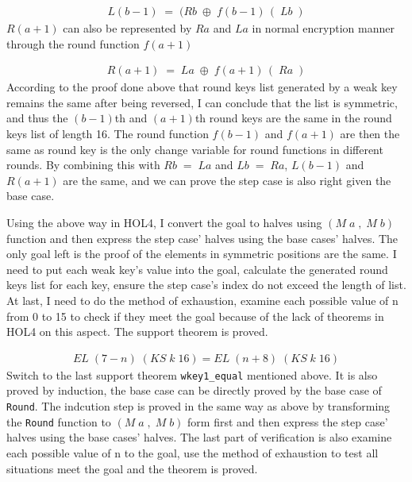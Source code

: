 \documentclass{article}
\begin{document}
\begin{equation*}
\begin{split}
   L(b-1) \; = \; (Rb \; \oplus \; f(b-1)\,(\;Lb\;)
\end{split}
\end{equation*}
$R(a+1)$ can also be represented by $Ra$ and $La$ in normal encryption manner through the round function $f(a+1)$

\begin{equation*}
\begin{split}
   R(a+1) \; = \; La \; \oplus \; f(a+1)\,(\;Ra\;)
\end{split}
\end{equation*}
According to the proof
done above that round keys list generated by a weak key remains the same after being reversed, I can conclude that the list
is  symmetric, and thus the $(b-1)$th and $(a+1)$th round keys are the same in the round keys list of length 16.
The round function $f(b-1)$ and $f(a+1)$ are then the same as round key is the only change variable for round functions in different
rounds. By combining this with $Rb\;= \; La$ and $Lb\;= \; Ra$, $L(b-1)$ and $R(a+1)$ are the same, and we can prove the step
case is also right given the base case.

Using the above way in HOL4, I convert the goal to halves using $(M\;a\;,\;M\;b)$ function and then
express the step case' halves using the base cases' halves. The only goal left is the proof of the elements in
symmetric positions are the same. I need to put each weak key's value into the goal, calculate the generated
round keys list for each key, ensure the step case's index do not exceed the length of list. At last, I need to
do the method of exhaustion, examine each possible value of n from 0 to 15 to check if they meet the goal because of
the lack of theorems in HOL4 on this aspect. The support theorem is proved.

\begin{equation*}
\begin{split}
 EL \; (7-n) \; (KS \; k \; 16) = EL \; (n+8) \; (KS \; k \; 16)
\end{split}
\end{equation*}
Switch to the last support theorem \verb|wkey1_equal| mentioned above. It is also proved by induction, the base case can
be directly proved by the base case of \verb|Round|. The indcution step is proved in the same way as above by transforming
the \verb|Round| function to $(M\;a\;,\;M\;b)$ form first and then express the step case' halves using the base cases' halves.
The last part of verification is also examine each possible value of n to the goal, use the method of exhaustion to
test all situations meet the goal and the theorem is proved.
\end{document}
